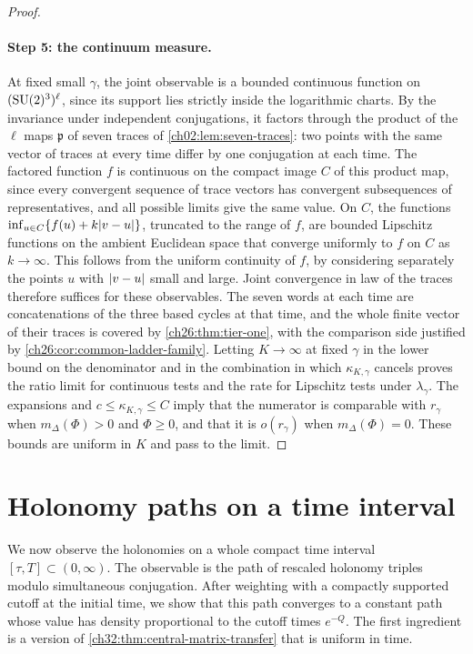 \begin{proof}
\paragraph{Step 5: the continuum measure.}
At fixed small $\gamma$, the joint observable is a bounded continuous function on $(\mathrm{SU}(2)^3)^\ell$, since its support lies strictly inside the logarithmic charts. By the invariance under independent conjugations, it factors through the product of the $\ell$ maps $\mathfrak p$ of seven traces of \cref{ch02:lem:seven-traces}: two points with the same vector of traces at every time differ by one conjugation at each time. The factored function $f$ is continuous on the compact image $C$ of this product map, since every convergent sequence of trace vectors has convergent subsequences of representatives, and all possible limits give the same value. On $C$, the functions $\inf_{u\in C}\{f(u)+k\lvert v-u\rvert\}$, truncated to the range of $f$, are bounded Lipschitz functions on the ambient Euclidean space that converge uniformly to $f$ on $C$ as $k\to\infty$. This follows from the uniform continuity of $f$, by considering separately the points $u$ with $\lvert v-u\rvert$ small and large. Joint convergence in law of the traces therefore suffices for these observables. The seven words at each time are concatenations of the three based cycles at that time, and the whole finite vector of their traces is covered by \cref{ch26:thm:tier-one}, with the comparison side justified by \cref{ch26:cor:common-ladder-family}. Letting $K\to\infty$ at fixed $\gamma$ in the lower bound on the denominator and in the combination in which $\kappa_{K,\gamma}$ cancels proves the ratio limit for continuous tests and the rate for Lipschitz tests under $\lambda_\gamma$. The expansions and $c\le\kappa_{K,\gamma}\le C$ imply that the numerator is comparable with $r_\gamma$ when $m_\Delta(\Phi)>0$ and $\Phi\ge0$, and that it is $o(r_\gamma)$ when $m_\Delta(\Phi)=0$. These bounds are uniform in $K$ and pass to the limit.
\end{proof}

\section{Holonomy paths on a time interval}\label{ch32:sec:paths}

We now observe the holonomies on a whole compact time interval $[\tau,T]\subset(0,\infty)$. The observable is the path of rescaled holonomy triples modulo simultaneous conjugation. After weighting with a compactly supported cutoff at the initial time, we show that this path converges to a constant path whose value has density proportional to the cutoff times $e^{-Q}$. The first ingredient is a version of \cref{ch32:thm:central-matrix-transfer} that is uniform in time.

